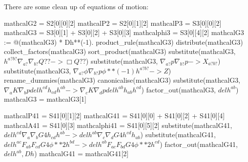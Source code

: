 \documentclass[10pt]{article}
\begin{document}
There are some clean up of equations of motion:
\begin{python}
mathcalG2 = S2[0][0][2]
mathcalP2 = S2[0][1][2]
mathcalP3 = S3[0][0][2]
mathcalG3 = S3[0][1] + S3[0][2] + S3[0][3]
mathcalphi3 = S3[0][4][2]
mathcalG3 := @(mathcalG3) * Dh**(-1).
product_rule(mathcalG3)
distribute(mathcalG3)
collect_factors(mathcalG3)
sort_product(mathcalG3)
substitute(mathcalG3, $h^{a? b?} \nabla_{a?}{\nabla_{b?}{Q??}} -> \Box{Q??}$)
substitute(mathcalG3, $\nabla_{a?}{p}\nabla_{b?}{p} -> X_{a? b?}$)
substitute(mathcalG3, $\nabla_{a?}{\phi}\nabla_{b?}{p} \phi**(-1) h^{a? b?} -> Z$)
rename_dummies(mathcalG3)
canonicalise(mathcalG3)
substitute(mathcalG3, $\nabla_{a}{K}\nabla_{b}{p}delh^{c d}h_{c d}h^{a b} -> \nabla_{c}{K}\nabla_{d}{p}delh^{a b}h_{a b}h^{c d}$)
factor_out(mathcalG3, $delh^{a b}$)
mathcalG3 = mathcalG3[1]
\end{python}
\begin{python}
mathcalP41 = S41[0][1][2]
mathcalG41 = S41[0][0] + S41[0][2] + S41[0][4]
mathcalA41 = S41[0][3]
mathcalphi41 = S41[0][5][2]
substitute(mathcalG41, $delh^{c d} \nabla_{a}{\nabla_{b}{G4}}h_{c d} h^{a b} -> delh^{a b} \nabla_{c}{\nabla_{d}{G4}}h^{c d} h_{a b}$)
substitute(mathcalG41, $delh^{a c} F_{a b} F_{c d} G4 \phi**2 h^{b d} -> delh^{a b} F_{a c} F_{b d} G4 \phi**2 h^{c d}$)
factor_out(mathcalG41, $delh^{a b}, Dh$)
mathcalG41 = mathcalG41[2]
\end{python}
\end{document}
